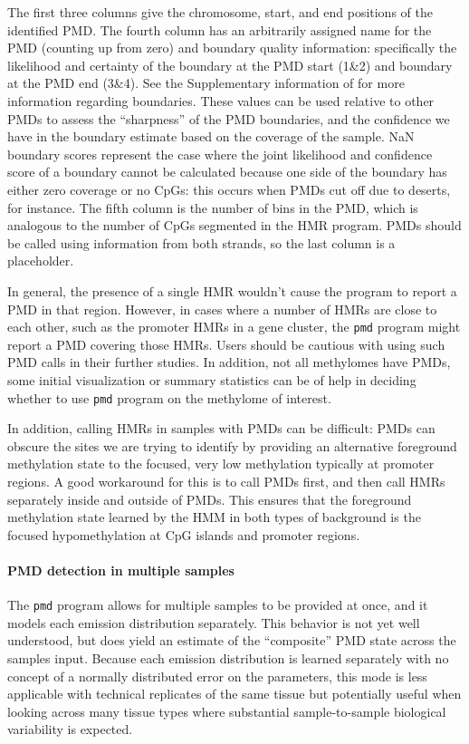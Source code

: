 \documentclass[10pt]{article}
\newcommand{\prog}[1]{\texttt{#1}}
\begin{document}
The first three columns give the chromosome, start, and end positions
of the identified PMD. The fourth column has an arbitrarily assigned
name for the PMD (counting up from zero) and boundary quality information:
specifically the likelihood and certainty of the boundary at the PMD start
(1\&2) and boundary at the PMD end (3\&4). See the Supplementary information
of \cite{decato2020characterization} for more information regarding 
boundaries. These values can be used relative to other PMDs to assess the
``sharpness'' of the PMD boundaries, and the confidence we have in the 
boundary estimate based on the coverage of the sample. NaN boundary scores
represent the case where the joint likelihood and confidence score of a
boundary cannot be calculated because one side of the boundary has either 
zero coverage or no CpGs: this occurs when
PMDs cut off due to deserts, for instance. The fifth column is 
the number of bins in the PMD, which is analogous to the number of CpGs
segmented in the HMR program. PMDs should be called using information from 
both strands, so the last column is a placeholder.

In general, the presence of a single HMR wouldn't cause the program to
report a PMD in that region. However, in cases where a number of HMRs
are close to each other, such as the promoter HMRs in a gene cluster,
the \prog{pmd} program might report a PMD covering those HMRs. Users
should be cautious with using such PMD calls in their further
studies. In addition, not all methylomes have PMDs, some initial
visualization or summary statistics can be of help in deciding whether
to use \prog{pmd} program on the methylome of interest.

In addition, calling HMRs in samples with PMDs can be difficult: PMDs
can obscure the sites we are trying to identify by providing an alternative
foreground methylation state to the focused, very low methylation typically
at promoter regions. A good workaround for this is to call PMDs first, and
then call HMRs separately inside and outside of PMDs. This ensures that
the foreground methylation state learned by the HMM in both types of background
is the focused hypomethylation at CpG islands and promoter regions.

\paragraph{PMD detection in multiple samples}

The \prog{pmd} program allows for multiple samples to be provided at once,
and it models each emission distribution separately. This behavior is not yet
well understood, but does yield an estimate of the ``composite'' PMD state
across the samples input. Because each emission distribution is learned
separately with no concept of a normally distributed error on the parameters,
this mode is less applicable with technical replicates of the same tissue but
potentially useful when looking across many tissue types where substantial
sample-to-sample biological variability is expected.
\end{document}
